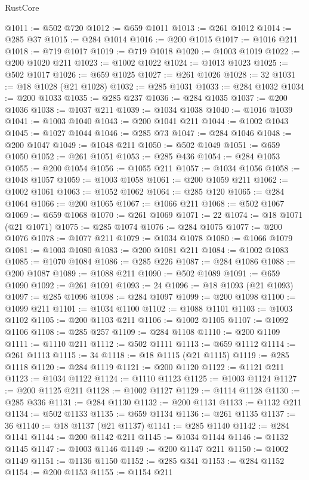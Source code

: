 \begin{lexlean}{RustCore}
\begin{coremodule}
@1011 := @502 @720
@1012 := @659 @1011
@1013 := @261 @1012
@1014 := @285 @37
@1015 := @284 @1014
@1016 := @200 @1015
@1017 := @1016 @211
@1018 := @719 @1017
@1019 := @719 @1018
@1020 := @1003 @1019
@1022 := @200 @1020 @211
@1023 := @1002 @1022
@1024 := @1013 @1023
@1025 := @502 @1017
@1026 := @659 @1025
@1027 := @261 @1026
@1028 := 32
@1031 := @18 @1028 (@21 @1028)
@1032 := @285 @1031
@1033 := @284 @1032
@1034 := @200 @1033
@1035 := @285 @237
@1036 := @284 @1035
@1037 := @200 @1036
@1038 := @1037 @211
@1039 := @1034 @1038
@1040 := @1016 @1039
@1041 := @1003 @1040
@1043 := @200 @1041 @211
@1044 := @1002 @1043
@1045 := @1027 @1044
@1046 := @285 @73
@1047 := @284 @1046
@1048 := @200 @1047
@1049 := @1048 @211
@1050 := @502 @1049
@1051 := @659 @1050
@1052 := @261 @1051
@1053 := @285 @436
@1054 := @284 @1053
@1055 := @200 @1054
@1056 := @1055 @211
@1057 := @1034 @1056
@1058 := @1048 @1057
@1059 := @1003 @1058
@1061 := @200 @1059 @211
@1062 := @1002 @1061
@1063 := @1052 @1062
@1064 := @285 @120
@1065 := @284 @1064
@1066 := @200 @1065
@1067 := @1066 @211
@1068 := @502 @1067
@1069 := @659 @1068
@1070 := @261 @1069
@1071 := 22
@1074 := @18 @1071 (@21 @1071)
@1075 := @285 @1074
@1076 := @284 @1075
@1077 := @200 @1076
@1078 := @1077 @211
@1079 := @1034 @1078
@1080 := @1066 @1079
@1081 := @1003 @1080
@1083 := @200 @1081 @211
@1084 := @1002 @1083
@1085 := @1070 @1084
@1086 := @285 @226
@1087 := @284 @1086
@1088 := @200 @1087
@1089 := @1088 @211
@1090 := @502 @1089
@1091 := @659 @1090
@1092 := @261 @1091
@1093 := 24
@1096 := @18 @1093 (@21 @1093)
@1097 := @285 @1096
@1098 := @284 @1097
@1099 := @200 @1098
@1100 := @1099 @211
@1101 := @1034 @1100
@1102 := @1088 @1101
@1103 := @1003 @1102
@1105 := @200 @1103 @211
@1106 := @1002 @1105
@1107 := @1092 @1106
@1108 := @285 @257
@1109 := @284 @1108
@1110 := @200 @1109
@1111 := @1110 @211
@1112 := @502 @1111
@1113 := @659 @1112
@1114 := @261 @1113
@1115 := 34
@1118 := @18 @1115 (@21 @1115)
@1119 := @285 @1118
@1120 := @284 @1119
@1121 := @200 @1120
@1122 := @1121 @211
@1123 := @1034 @1122
@1124 := @1110 @1123
@1125 := @1003 @1124
@1127 := @200 @1125 @211
@1128 := @1002 @1127
@1129 := @1114 @1128
@1130 := @285 @336
@1131 := @284 @1130
@1132 := @200 @1131
@1133 := @1132 @211
@1134 := @502 @1133
@1135 := @659 @1134
@1136 := @261 @1135
@1137 := 36
@1140 := @18 @1137 (@21 @1137)
@1141 := @285 @1140
@1142 := @284 @1141
@1144 := @200 @1142 @211
@1145 := @1034 @1144
@1146 := @1132 @1145
@1147 := @1003 @1146
@1149 := @200 @1147 @211
@1150 := @1002 @1149
@1151 := @1136 @1150
@1152 := @285 @341
@1153 := @284 @1152
@1154 := @200 @1153
@1155 := @1154 @211

\end{coremodule}
\end{lexlean}
